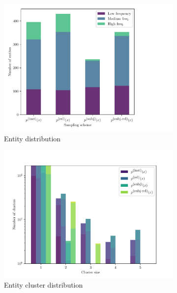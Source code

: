 \begin{figure}
  \centering
  \begin{subfigure}{0.8\textwidth}
    \includegraphics[width=\textwidth]{figures/analysis/selective_supervised_entity}
    \caption{Entity distribution}
  \end{subfigure}

  \begin{subfigure}{0.8\textwidth}
    \includegraphics[width=\textwidth]{figures/analysis/selective_supervised_clusters}
    \caption{Entity cluster distribution}
  \end{subfigure}

  \caption[Comparison of relation sampling distributions]{\label{fig:kbpo:selective_supervised_entity}
  }
\end{figure}

